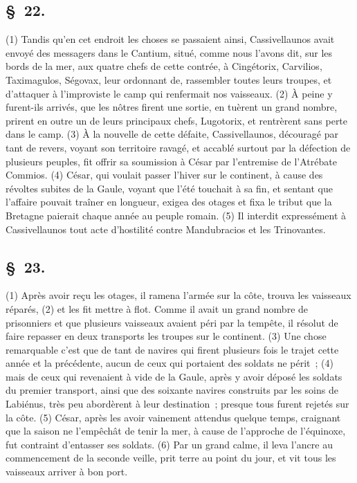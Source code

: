 \documentclass[french,twoside]{book} %
\begin{document}
\subsection[{§ 22.}]{ \textsc{§ 22.} }
\noindent (1) Tandis qu’en cet endroit les choses se passaient ainsi, Cassivellaunos avait envoyé des messagers dans le Cantium, situé, comme nous l’avons dit, sur les bords de la mer, aux quatre chefs de cette contrée, à Cingétorix, Carvilios, Taximagulos, Ségovax, leur ordonnant de, rassembler toutes leurs troupes, et d’attaquer à l’improviste le camp qui renfermait nos vaisseaux. (2) À peine y furent-ils arrivés, que les nôtres firent une sortie, en tuèrent un grand nombre, prirent en outre un de leurs principaux chefs, Lugotorix, et rentrèrent sans perte dans le camp. (3) À la nouvelle de cette défaite, Cassivellaunos, découragé par tant de revers, voyant son territoire ravagé, et accablé surtout par la défection de plusieurs peuples, fit offrir sa soumission à César par l’entremise de l’Atrébate Commios. (4) César, qui voulait passer l’hiver sur le continent, à cause des révoltes subites de la Gaule, voyant que l’été touchait à sa fin, et sentant que l’affaire pouvait traîner en longueur, exigea des otages et fixa le tribut que la Bretagne paierait chaque année au peuple romain. (5) Il interdit expressément à Cassivellaunos tout acte d’hostilité contre Mandubracios et les Trinovantes.
\subsection[{§ 23.}]{ \textsc{§ 23.} }
\noindent (1) Après avoir reçu les otages, il ramena l’armée sur la côte, trouva les vaisseaux réparés, (2) et les fit mettre à flot. Comme il avait un grand nombre de prisonniers et que plusieurs vaisseaux avaient péri par la tempête, il résolut de faire repasser en deux transports les troupes sur le continent. (3) Une chose remarquable c’est que de tant de navires qui firent plusieurs fois le trajet cette année et la précédente, aucun de ceux qui portaient des soldats ne périt ; (4) mais de ceux qui revenaient à vide de la Gaule, après y avoir déposé les soldats du premier transport, ainsi que des soixante navires construits par les soins de Labiénus, très peu abordèrent à leur destination ; presque tous furent rejetés sur la côte. (5) César, après les avoir vainement attendus quelque temps, craignant que la saison ne l’empêchât de tenir la mer, à cause de l’approche de l’équinoxe, fut contraint d’entasser ses soldats. (6) Par un grand calme, il leva l’ancre au commencement de la seconde veille, prit terre au point du jour, et vit tous les vaisseaux arriver à bon port.
\end{document}
